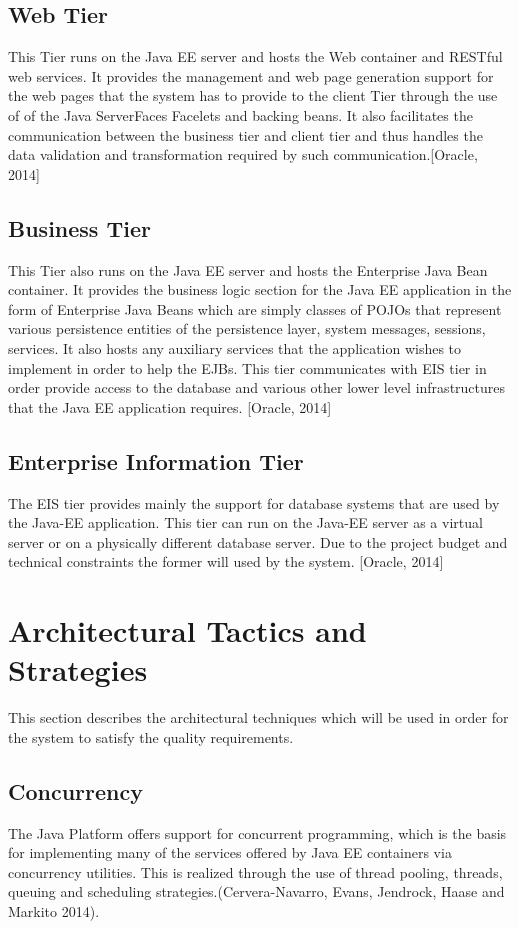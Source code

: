 \documentclass[12pt]{article}
\begin{document}
\subsection{Web Tier}
This Tier runs on the Java EE server and hosts the Web container and RESTful web services. It provides the management and web page generation support for the web pages that the system has to provide to the client Tier through the use of of the Java ServerFaces Facelets and backing beans. It also facilitates the communication between the business tier and client tier and thus handles the data validation and transformation required by such communication.[Oracle, 2014] 
\subsection{Business Tier}
This Tier also runs on the Java EE server and hosts the Enterprise Java Bean container. It provides the business logic section for the Java EE application in the form of Enterprise Java Beans which are simply classes of POJOs that represent various persistence entities of the persistence layer, system messages, sessions, services. It also hosts any auxiliary services that the application wishes to implement in order to help the EJBs. This tier communicates with EIS tier in order provide access to the database and various other lower level infrastructures that the Java EE application requires. [Oracle, 2014]

\subsection{Enterprise Information Tier} 
The EIS tier provides mainly the support for database systems that are used by the Java-EE application. This tier can run on the Java-EE server as a virtual server or on a physically different database server. Due to the project budget and technical constraints the former will used by the system. [Oracle, 2014] 
 
\section{Architectural Tactics and Strategies} %
This section describes the architectural techniques which will be used in order for the system to satisfy the quality requirements. 

\subsection{Concurrency}
The Java Platform offers support for concurrent programming, which is the basis for implementing many of the services offered by Java EE containers via concurrency utilities. This is realized through the use of thread pooling, threads, queuing and scheduling strategies.(Cervera-Navarro, Evans, Jendrock, Haase and Markito 2014).\\
\end{document}
